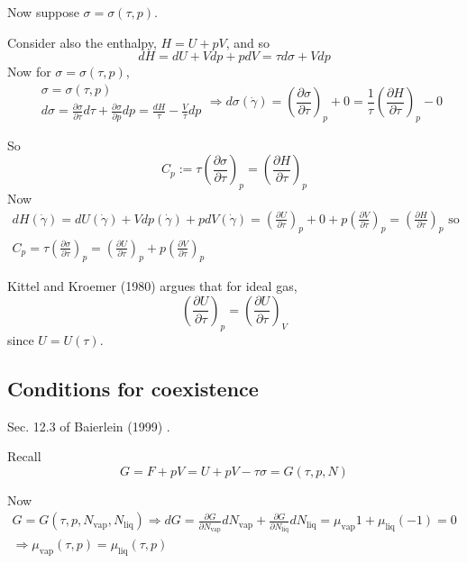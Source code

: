 Now suppose $\sigma = \sigma(\tau, p)$.  

Consider also the enthalpy,  $H = U + pV$, and so
\[
dH = dU + Vdp + pdV = \tau d\sigma + Vdp
\]
Now for $\sigma = \sigma(\tau,p)$,
\[
\begin{aligned}
  & \sigma = \sigma(\tau,p) \\ 
  & d\sigma = \frac{ \partial \sigma }{ \partial \tau} d\tau + \frac{ \partial \sigma }{ \partial p } dp = \frac{dH}{\tau} - \frac{V}{\tau} dp
\end{aligned} \Longrightarrow d\sigma(\dot{\gamma}) = \left( \frac{ \partial \sigma }{ \partial \tau} \right)_p + 0 = \frac{1}{\tau} \left( \frac{ \partial H}{ \partial \tau} \right)_p - 0 
\]

So 
\[
C_p := \tau \left( \frac{ \partial \sigma }{ \partial \tau } \right)_p = \left( \frac{ \partial H}{ \partial \tau} \right)_p
\]
Now 
\[
\begin{gathered}
  dH(\dot{\gamma}) = dU(\dot{\gamma}) + Vdp(\dot{\gamma} ) + pdV(\dot{\gamma}) = \left( \frac{ \partial U }{ \partial \tau} \right)_p + 0 + p \left( \frac{ \partial V}{ \partial \tau} \right)_p = \left( \frac{ \partial H }{ \partial \tau } \right)_p \text{ so } \\ 
  C_p = \tau \left( \frac{ \partial \sigma }{ \partial \tau} \right)_p = \left( \frac{ \partial U}{ \partial \tau} \right)_p + p\left( \frac{ \partial V}{ \partial \tau} \right)_p 
\end{gathered}
\]

Kittel and Kroemer (1980) \cite{CKittelHKroemer1980} argues that for ideal gas, 
\[
\left( \frac{ \partial U}{ \partial \tau} \right)_p = \left( \frac{ \partial U}{ \partial \tau} \right)_V
\]
since $U = U(\tau)$.  

\subsection{Conditions for coexistence} Sec. 12.3 of Baierlein (1999) \cite{RBaierlein1999}.  

Recall 
\[
G = F + pV = U + pV - \tau \sigma =G(\tau,p,N)
\]

Now 
\[
\begin{gathered}
  G = G(\tau, p, N_{\text{vap}}, N_{\text{liq}} )
\Longrightarrow dG = \frac{ \partial G}{ \partial N_{\text{vap}}} dN_{\text{vap}} + \frac{ \partial G}{ \partial N_{\text{liq}} } dN_{\text{liq}} = \mu_{\text{vap}} 1 + \mu_{\text{liq}} (-1) = 0  \\
\Longrightarrow \mu_{\text{vap}}(\tau,p) = \mu_{\text{liq}}(\tau,p)
\end{gathered}
\]


